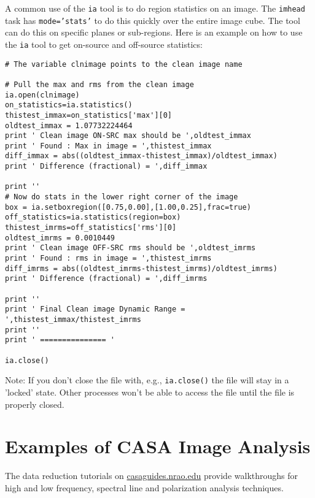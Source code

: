 A common use of the {\tt ia} tool is to do region statistics on an
image.  The {\tt imhead} task has {\tt mode='stats'} to do this
quickly over the entire image cube.  The tool can do this on specific
planes or sub-regions.  Here is an example on how to use the {\tt ia}
tool to get on-source and off-source statistics: 

\small
\begin{verbatim}
# The variable clnimage points to the clean image name

# Pull the max and rms from the clean image
ia.open(clnimage)
on_statistics=ia.statistics()
thistest_immax=on_statistics['max'][0]
oldtest_immax = 1.07732224464
print ' Clean image ON-SRC max should be ',oldtest_immax
print ' Found : Max in image = ',thistest_immax
diff_immax = abs((oldtest_immax-thistest_immax)/oldtest_immax)
print ' Difference (fractional) = ',diff_immax

print ''
# Now do stats in the lower right corner of the image
box = ia.setboxregion([0.75,0.00],[1.00,0.25],frac=true)
off_statistics=ia.statistics(region=box)
thistest_imrms=off_statistics['rms'][0]
oldtest_imrms = 0.0010449
print ' Clean image OFF-SRC rms should be ',oldtest_imrms
print ' Found : rms in image = ',thistest_imrms
diff_imrms = abs((oldtest_imrms-thistest_imrms)/oldtest_imrms)
print ' Difference (fractional) = ',diff_imrms

print ''
print ' Final Clean image Dynamic Range = ',thistest_immax/thistest_imrms
print ''
print ' =============== '

ia.close()

\end{verbatim}
\normalsize

Note: If you don't close the file with, e.g., {\tt ia.close()} the
file will stay in a 'locked' state. Other processes won't be able to
access the file until the file is properly closed. 

\section{Examples of CASA Image Analysis}
\label{section:analysis.examples}

The data reduction tutorials on \url{casaguides.nrao.edu} provide
walkthroughs for
high and low frequency, spectral line and polarization analysis
techniques. 


